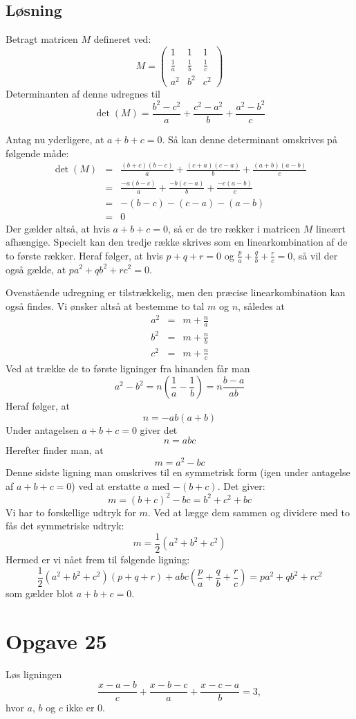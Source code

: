 \documentclass[12pt,oneside,a4paper]{article}
\newcommand{\bas}{\begin{eqnarray*}}
\newcommand{\eas}{\end{eqnarray*}}
\begin{document}
\subsection{Løsning}
Betragt matricen $M$ defineret ved:
$$
M = \left(\begin{array}{ccc}
    1 & 1 & 1 \\
    \frac{1}{a} & \frac{1}{b} & \frac{1}{c} \\
    a^2 & b^2 & c^2 
\end{array}
\right)
$$
Determinanten af denne udregnes til
$$
\det(M) = \frac{b^2-c^2}{a} + \frac{c^2-a^2}{b} + \frac{a^2-b^2}{c}
$$

Antag nu yderligere, at $a+b+c=0$. Så kan denne determinant omskrives på følgende måde:
\bas
\det(M) &=& \frac{(b+c)(b-c)}{a} + \frac{(c+a)(c-a)}{b} + \frac{(a+b)(a-b)}{c} \\
        &=& \frac{-a(b-c)}{a} + \frac{-b(c-a)}{b} + \frac{-c(a-b)}{c} \\
        &=& -(b-c) - (c-a) - (a-b) \\
        &=& 0
\eas
Der gælder altså, at hvis $a+b+c=0$, så er de tre rækker i matricen $M$ lineært afhængige. Specielt kan den tredje række skrives som en linearkombination af de to første rækker.
Heraf følger, at hvis $p+q+r=0$ og $\frac{p}{a} + \frac{q}{b} + \frac{r}{c}=0$, så vil der også gælde, at $pa^2+qb^2+rc^2=0$.

Ovenstående udregning er tilstrækkelig, men den præcise linearkombination kan også findes. Vi ønsker altså at bestemme to tal $m$ og $n$, således at
\bas
a^2 &=& m+\frac{n}{a} \\
b^2 &=& m+\frac{n}{b} \\
c^2 &=& m+\frac{n}{c} 
\eas
Ved at trække de to første ligninger fra hinanden får man
$$
a^2-b^2 = n\left(\frac{1}{a}-\frac{1}{b}\right) = n \frac{b-a}{ab}
$$
Heraf følger, at 
$$
n = -ab(a+b)
$$
Under antagelsen $a+b+c=0$ giver det
$$
n=abc
$$
Herefter finder man, at
$$
m=a^2-bc
$$
Denne sidste ligning man omskrives til en symmetrisk form (igen under antagelse af $a+b+c=0$) ved at erstatte $a$ med $-(b+c)$. Det giver:
$$
m=(b+c)^2-bc = b^2+c^2+bc
$$
Vi har to forskellige udtryk for $m$. Ved at lægge dem sammen og dividere med to fås det symmetriske udtryk:
$$
m=\frac{1}{2} (a^2+b^2+c^2)
$$
Hermed er vi nået frem til følgende ligning:
$$
\frac{1}{2} (a^2+b^2+c^2) (p+q+r) + abc \left(\frac{p}{a} + \frac{q}{b} + \frac{r}{c} \right) = pa^2+qb^2+rc^2
$$
som gælder blot $a+b+c=0$.



\section{Opgave 25}
Løs ligningen
$$
\frac{x-a-b}{c} + \frac{x-b-c}{a} + \frac{x-c-a}{b} = 3,
$$
hvor $a$, $b$ og $c$ ikke er 0.
\end{document}
